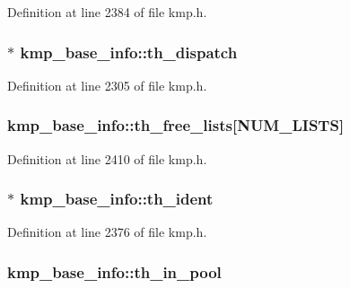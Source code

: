 Definition at line 2384 of file kmp.\-h.

\hypertarget{structkmp__base__info_a0b55c692c13be110491c23a0085f6730}{
\subsubsection[{th\-\_\-dispatch}]{$\ast$ kmp\-\_\-base\-\_\-info\-::th\-\_\-dispatch}}\label{structkmp__base__info_a0b55c692c13be110491c23a0085f6730}


Definition at line 2305 of file kmp.\-h.

\hypertarget{structkmp__base__info_aa88271560ab80247998b1ef3dc605a64}{
\subsubsection[{th\-\_\-free\-\_\-lists}]{ kmp\-\_\-base\-\_\-info\-::th\-\_\-free\-\_\-lists\mbox{[}{\bf N\-U\-M\-\_\-\-L\-I\-S\-T\-S}\mbox{]}}}\label{structkmp__base__info_aa88271560ab80247998b1ef3dc605a64}


Definition at line 2410 of file kmp.\-h.

\hypertarget{structkmp__base__info_ae9082db92f2664d4c077862cb3cfc1a7}{
\subsubsection[{th\-\_\-ident}]{$\ast$ kmp\-\_\-base\-\_\-info\-::th\-\_\-ident}}\label{structkmp__base__info_ae9082db92f2664d4c077862cb3cfc1a7}


Definition at line 2376 of file kmp.\-h.

\hypertarget{structkmp__base__info_abc2b3156a7154e8343a8784eeb505636}{
\subsubsection[{th\-\_\-in\-\_\-pool}]{ kmp\-\_\-base\-\_\-info\-::th\-\_\-in\-\_\-pool}}\label{structkmp__base__info_abc2b3156a7154e8343a8784eeb505636}


